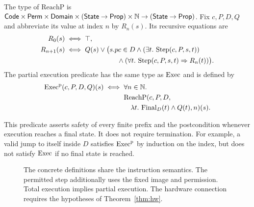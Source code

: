 \begin{definition}\label{def:execp}
The type of $\mathrm{ReachP}$ is $\mathsf{Code}\times\mathsf{Perm}\times\mathsf{Domain}\times(\mathsf{State}\to\mathsf{Prop})\times\mathbb{N}\to(\mathsf{State}\to\mathsf{Prop})$. Fix $c,P,D,Q$ and abbreviate its value at index $n$ by $R_n(s)$. Its recursive equations are
\[
\begin{aligned}
R_0(s)&\iff\top,\\
R_{n+1}(s)&\iff Q(s)\lor\big(s.pc\in D\land (\exists t.\ \Step(c,P,s,t))\\
&\hspace{27mm}\land (\forall t.\ \Step(c,P,s,t)\Rightarrow R_n(t))\big).
\end{aligned}
\]
The partial execution predicate has the same type as $\mathrm{Exec}$ and is defined by
\[\begin{aligned}\mathrm{Exec}^{\mathrm p}(c,P,D,Q)(s)\iff{}&\forall n\in\mathbb{N}.\\ &\mathrm{ReachP}(c,P,D,\\ &\quad\lambda t.\ \mathrm{Final}_D(t)\land Q(t),n)(s).\end{aligned}\]
\end{definition}

This predicate asserts safety of every finite prefix and the postcondition whenever execution reaches a final state. It does not require termination. For example, a valid jump to itself inside $D$ satisfies $\mathrm{Exec}^{\mathrm p}$ by induction on the index, but does not satisfy $\mathrm{Exec}$ if no final state is reached.
\begin{figure}[t]
\centering
{}
\caption{The concrete definitions share the instruction semantics. The permitted step additionally uses the fixed image and permission. Total execution implies partial execution. The hardware connection requires the hypotheses of Theorem~\ref{thm:hw}.}
\end{figure}


